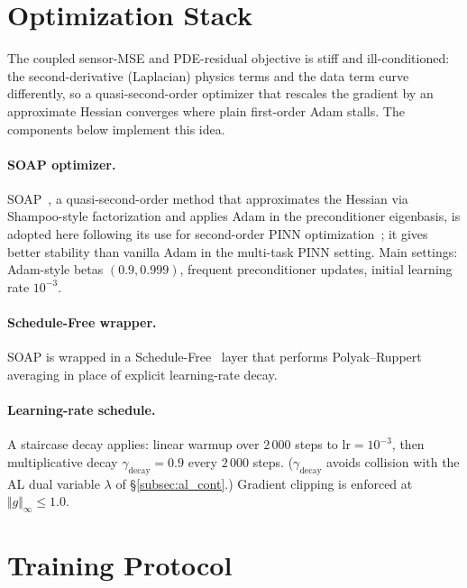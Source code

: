 \section{Optimization Stack}
\label{sec:optimization}

The coupled sensor-MSE and PDE-residual objective is stiff and ill-conditioned: the second-derivative (Laplacian) physics terms and the data term curve differently, so a quasi-second-order optimizer that rescales the gradient by an approximate Hessian converges where plain first-order Adam stalls. The components below implement this idea.

\paragraph{SOAP optimizer.}
SOAP~\cite{Vyas2024SOAP}, a quasi-second-order method that approximates the Hessian via Shampoo-style factorization and applies Adam in the preconditioner eigenbasis, is adopted here following its use for second-order PINN optimization~\cite{wang2025gradientalignmentpinns}; it gives better stability than vanilla Adam in the multi-task PINN setting. Main settings: Adam-style betas $(0.9,0.999)$, frequent preconditioner updates, initial learning rate $10^{-3}$.

\paragraph{Schedule-Free wrapper.}
SOAP is wrapped in a Schedule-Free~\cite{ScheduleFree2024} layer that performs Polyak--Ruppert averaging in place of explicit learning-rate decay.

\paragraph{Learning-rate schedule.}
A staircase decay applies: linear warmup over $2\,000$ steps to $\text{lr} = 10^{-3}$, then multiplicative decay $\gamma_{\text{decay}} = 0.9$ every $2\,000$ steps. ($\gamma_{\text{decay}}$ avoids collision with the AL dual variable $\lambda$ of \S\ref{subsec:al_cont}.) Gradient clipping is enforced at $\Vert g\Vert_\infty \le 1.0$.

\section{Training Protocol}
\label{sec:training_protocol}

